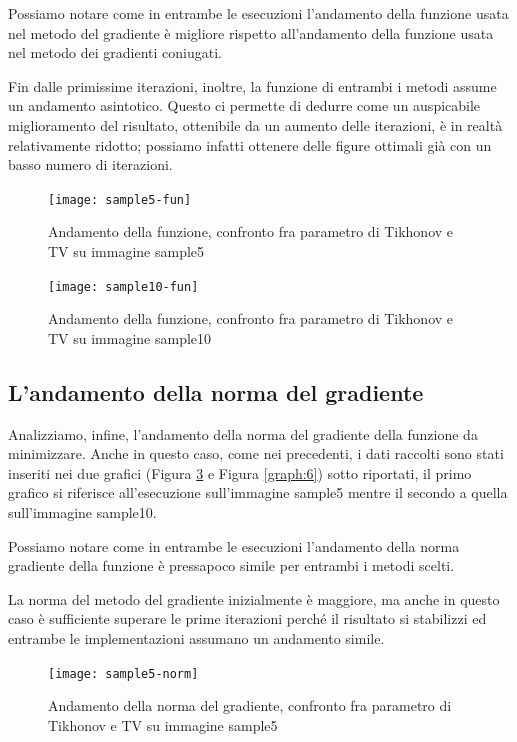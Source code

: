 \documentclass[12pt]{article}
\begin{document}
    Possiamo notare come in entrambe le esecuzioni l'andamento della funzione usata nel metodo del gradiente è migliore rispetto all'andamento della funzione usata nel metodo dei gradienti coniugati.

    Fin dalle primissime iterazioni, inoltre, la funzione di entrambi i metodi assume un andamento asintotico.
    Questo ci permette di dedurre come un auspicabile miglioramento del risultato,  ottenibile da un aumento delle iterazioni, è in realtà relativamente ridotto; possiamo infatti ottenere delle figure ottimali già con un basso numero di iterazioni.

    \begin{figure}[h!]
    \centering
    \texttt{[image: sample5-fun]}
    \caption{Andamento della funzione, confronto fra parametro di Tikhonov e TV su immagine sample5}
    \label{graph:3}
    \end{figure}

    \begin{figure}[h!]
    \centering
    \texttt{[image: sample10-fun]}
    \caption{Andamento della funzione, confronto fra parametro di Tikhonov e TV su immagine sample10}
    \label{graph:4}
    \end{figure}

\cleardoublepage

\cleardoublepage
    \subsection{L'andamento della norma del gradiente}
    Analizziamo, infine, l'andamento della norma del gradiente della funzione da minimizzare. Anche in questo caso, come nei precedenti, i dati raccolti sono stati inseriti nei due grafici (Figura \ref{graph:5} e Figura \ref{graph:6}) sotto riportati, il primo grafico si riferisce all'esecuzione sull'immagine sample5 mentre il secondo a quella sull'immagine sample10.

    Possiamo notare come in entrambe le esecuzioni l'andamento della norma gradiente della funzione è pressapoco simile per entrambi i metodi scelti.

    La norma del metodo del gradiente inizialmente è maggiore, ma anche in questo caso è sufficiente superare le prime iterazioni perché il risultato si stabilizzi ed entrambe le implementazioni assumano un andamento simile.

    \begin{figure}[h!]
    \centering
    \texttt{[image: sample5-norm]}
    \caption{Andamento della norma del gradiente, confronto fra parametro di Tikhonov e TV su immagine sample5}
    \label{graph:5}
    \end{figure}
\end{document}

